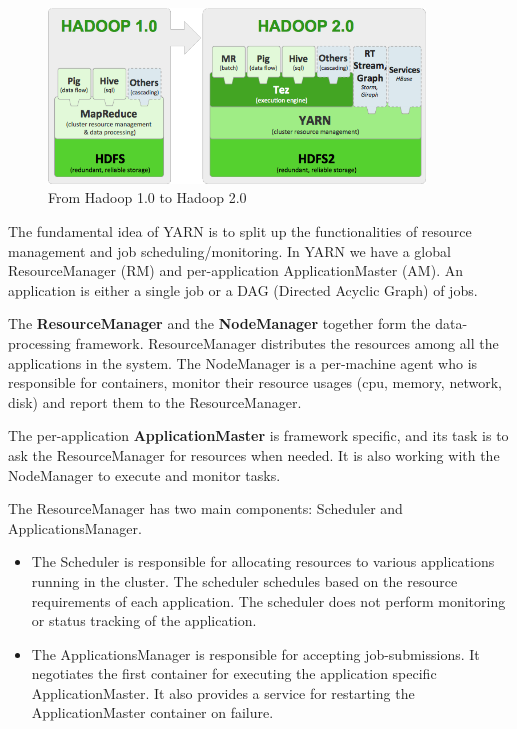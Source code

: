 \begin{figure}[H]
	\includegraphics[width=100mm, keepaspectratio]{figures/hadoop10vs20.png}
	\centering
	\caption*{From Hadoop 1.0 to Hadoop 2.0}
	\centering
\end{figure}

The fundamental idea of YARN is to split up the functionalities of resource management and job scheduling/monitoring. In YARN we have a global ResourceManager (RM) and per-application ApplicationMaster (AM). An application is either a single job or a DAG (Directed Acyclic Graph) of jobs. 

The \textbf{ResourceManager} and the \textbf{NodeManager} together form the data-processing framework. ResourceManager distributes the resources among all the applications in the system. The NodeManager is a per-machine agent who is responsible for containers, monitor their resource usages (cpu, memory, network, disk) and report them to the ResourceManager. 

The per-application \textbf{ApplicationMaster} is framework specific, and its task is to ask the ResourceManager for resources when needed. It is also working with the NodeManager to execute and monitor tasks.

The ResourceManager has two main components: Scheduler and ApplicationsManager.
\begin{itemize}
	\item The Scheduler is responsible for allocating resources to various applications running in the cluster. The scheduler schedules based on the resource requirements of each application. The scheduler does not perform monitoring or status tracking of the application. 
	\item The ApplicationsManager is responsible for accepting job-submissions. It negotiates the first container for executing the application specific ApplicationMaster. It also provides a service for restarting the ApplicationMaster container on failure. 
\end{itemize}

